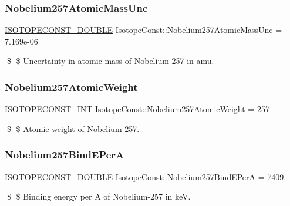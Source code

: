\subsubsection{\texorpdfstring{Nobelium257\+Atomic\+Mass\+Unc}{Nobelium257AtomicMassUnc}}
{\footnotesize\ttfamily \mbox{\hyperlink{group___isotope_const-_macros_ga8f45a7272ce02c0b4c65c44636ed719a}{I\+S\+O\+T\+O\+P\+E\+C\+O\+N\+S\+T\+\_\+\+D\+O\+U\+B\+LE}} Isotope\+Const\+::\+Nobelium257\+Atomic\+Mass\+Unc = 7.\+169e-\/06}

\$ \$ Uncertainty in atomic mass of Nobelium-\/257 in amu. \mbox{\label{group___isotope_const-_nobelium-_no257_gabf2401210fc2e359451019477a78ec0c}} 
\subsubsection{\texorpdfstring{Nobelium257\+Atomic\+Weight}{Nobelium257AtomicWeight}}
{\footnotesize\ttfamily \mbox{\hyperlink{group___isotope_const-_macros_ga5f18360b3e99483a35c32d789e62621c}{I\+S\+O\+T\+O\+P\+E\+C\+O\+N\+S\+T\+\_\+\+I\+NT}} Isotope\+Const\+::\+Nobelium257\+Atomic\+Weight = 257}

\$ \$ Atomic weight of Nobelium-\/257. \mbox{\label{group___isotope_const-_nobelium-_no257_ga35a03205590499921c82b46e868e94e8}} 
\subsubsection{\texorpdfstring{Nobelium257\+Bind\+E\+PerA}{Nobelium257BindEPerA}}
{\footnotesize\ttfamily \mbox{\hyperlink{group___isotope_const-_macros_ga8f45a7272ce02c0b4c65c44636ed719a}{I\+S\+O\+T\+O\+P\+E\+C\+O\+N\+S\+T\+\_\+\+D\+O\+U\+B\+LE}} Isotope\+Const\+::\+Nobelium257\+Bind\+E\+PerA = 7409.}

\$ \$ Binding energy per A of Nobelium-\/257 in keV. \mbox{\label{group___isotope_const-_nobelium-_no257_gad4c904609989854ab0fbd3d9b5a830b2}} 
